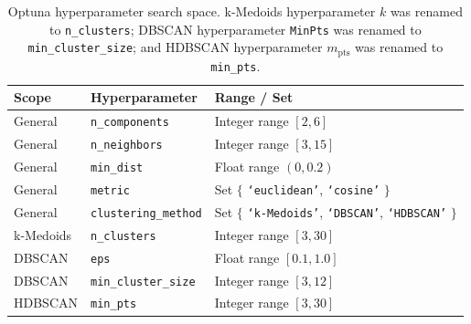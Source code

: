 \documentclass[10pt,oneside]{report}
\begin{document}
\begin{table}[htbp]
    \fontsize{8}{11}\selectfont %
    \centering
    \renewcommand{\arraystretch}{1.2} %
    \begin{tabularx}{\textwidth}{l l X}
        \toprule %
        \textbf{Scope} & \textbf{Hyperparameter} & \textbf{Range / Set} \\ %
        \midrule %
        General       & \texttt{n\_components}       & Integer range $[2, 6]$ \\
        General       & \texttt{n\_neighbors}        & Integer range $[3, 15]$ \\
        General       & \texttt{min\_dist}           & Float range $(0, 0.2)$ \\
        General       & \texttt{metric}              & Set $\{$ \texttt{`euclidean'}, \texttt{`cosine'} $\}$ \\
        General       & \texttt{clustering\_method}  & Set $\{$ \texttt{`k-Medoids'}, \texttt{`DBSCAN'}, \texttt{`HDBSCAN'} $\}$ \\
        k-Medoids     & \texttt{n\_clusters}         & Integer range $[3, 30]$ \\
        DBSCAN        & \texttt{eps}                 & Float range $[0.1, 1.0]$ \\
        DBSCAN        & \texttt{min\_cluster\_size}  & Integer range $[3, 12]$ \\
        HDBSCAN       & \texttt{min\_pts}            & Integer range $[3, 30]$ \\
        \bottomrule %
    \end{tabularx}
    \renewcommand{\arraystretch}{1.0} %
    \caption{Optuna hyperparameter search space. k-Medoids hyperparameter $k$ was renamed to \texttt{n\_clusters}; DBSCAN hyperparameter \texttt{MinPts} was renamed to \texttt{min\_cluster\_size}; and HDBSCAN hyperparameter $m_{\text{pts}}$ was renamed to \texttt{min\_pts}.} %
    \label{tab:hypreal}
\end{table}
\end{document}
